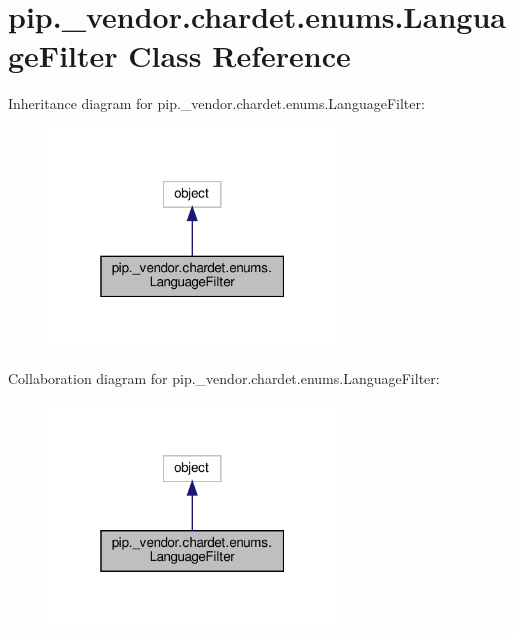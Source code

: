 \hypertarget{classpip_1_1__vendor_1_1chardet_1_1enums_1_1LanguageFilter}{}\section{pip.\+\_\+vendor.\+chardet.\+enums.\+Language\+Filter Class Reference}
\label{classpip_1_1__vendor_1_1chardet_1_1enums_1_1LanguageFilter}


Inheritance diagram for pip.\+\_\+vendor.\+chardet.\+enums.\+Language\+Filter\+:
\nopagebreak
\begin{figure}[H]
\begin{center}
\leavevmode
\includegraphics[width=217pt]{classpip_1_1__vendor_1_1chardet_1_1enums_1_1LanguageFilter__inherit__graph}
\end{center}
\end{figure}


Collaboration diagram for pip.\+\_\+vendor.\+chardet.\+enums.\+Language\+Filter\+:
\nopagebreak
\begin{figure}[H]
\begin{center}
\leavevmode
\includegraphics[width=217pt]{classpip_1_1__vendor_1_1chardet_1_1enums_1_1LanguageFilter__coll__graph}
\end{center}
\end{figure}
